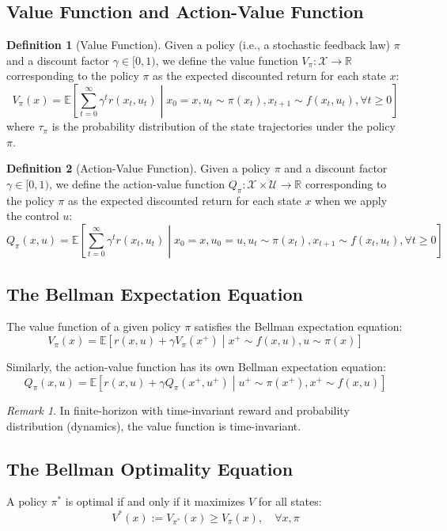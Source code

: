 \documentclass[openany]{book}
\theoremstyle{definition}
\newtheorem{definition}{Definition}[section]
\theoremstyle{remark}
\newtheorem*{remark}{Remark}
\begin{document}
\subsection{Value Function and Action-Value Function}
\begin{definition}[Value Function]
Given a policy (i.e., a stochastic feedback law) $\pi$ and a discount factor $\gamma \in [0,1)$, we define the value function $V_\pi: \mathcal{X} \to \mathbb{R}$ corresponding to the policy $\pi$ as the expected discounted return for each state $x$:
\[
V_\pi(x) = \mathbb{E}\left[\sum_{t=0}^{\infty} \gamma^t r(x_t, u_t) \middle| x_0 = x, u_t \sim \pi(x_t), x_{t+1} \sim f(x_t, u_t), \forall t \geq 0\right]
\]
where $\tau_\pi$ is the probability distribution of the state trajectories under the policy $\pi$.
\end{definition}

\begin{definition}[Action-Value Function]
Given a policy $\pi$ and a discount factor $\gamma \in [0,1)$, we define the action-value function $Q_\pi: \mathcal{X} \times \mathcal{U} \to \mathbb{R}$ corresponding to the policy $\pi$ as the expected discounted return for each state $x$ when we apply the control $u$:
\[
Q_\pi(x, u) = \mathbb{E}\left[\sum_{t=0}^{\infty} \gamma^t r(x_t, u_t) \middle| x_0 = x, u_0 = u, u_t \sim \pi(x_t), x_{t+1} \sim f(x_t, u_t), \forall t \geq 0\right]
\]
\end{definition}

\subsection{The Bellman Expectation Equation}
The value function of a given policy $\pi$ satisfies the Bellman expectation equation:
\[
V_\pi(x) = \mathbb{E}\left[r(x, u) + \gamma V_\pi(x^+) \middle| x^+ \sim f(x, u), u \sim \pi(x)\right]
\]

Similarly, the action-value function has its own Bellman expectation equation:
\[
Q_\pi(x, u) = \mathbb{E}\left[r(x, u) + \gamma Q_\pi(x^+, u^+) \middle| u^+ \sim \pi(x^+), x^+ \sim f(x, u)\right]
\]

\begin{remark}
In finite-horizon with time-invariant reward and probability distribution (dynamics), the value function is time-invariant.
\end{remark}

\subsection{The Bellman Optimality Equation}
A policy $\pi^*$ is optimal if and only if it maximizes $V$ for all states:
\[
V^*(x) := V_{\pi^*}(x) \geq V_\pi(x), \quad \forall x, \pi
\]
\end{document}
